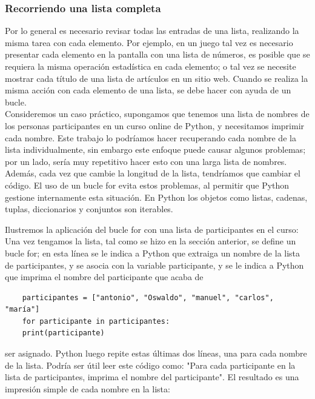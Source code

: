 \subsubsection{Recorriendo una lista completa}

Por lo general es necesario revisar todas las entradas de una lista, realizando la misma
tarea con cada elemento. Por ejemplo, en un juego tal vez es necesario presentar cada elemento en la pantalla con una lista de números, es posible que se requiera la misma operación estadística en cada elemento; o tal vez se necesite mostrar cada título de una lista de artículos en un sitio web.  Cuando se realiza la misma acción con cada elemento de una lista, se debe hacer con ayuda de un bucle.\\

Consideremos un caso práctico, supongamos que tenemos una lista de nombres de los personas participantes en un curso online de Python, y necesitamos imprimir cada nombre. Este trabajo lo podríamos hacer recuperando cada nombre de la lista individualmente, sin embargo este enfoque puede causar algunos problemas; por un lado, sería muy repetitivo hacer esto con una larga lista de nombres. Además, cada vez que cambie la longitud de la lista, tendríamos que cambiar el código. El uso de un bucle {\ttfamily for} evita estos problemas, al permitir que Python gestione internamente esta situación. En Python los objetos como listas, cadenas, tuplas, diccionarios y conjuntos son iterables. 

Ilustremos la aplicación del bucle {\ttfamily for} con una lista de participantes en el curso:
Una vez tengamos la lista, tal como se hizo en la sección anterior, se define
un bucle {\ttfamily for}; en esta línea se le indica a Python que extraiga un nombre de la lista de {\ttfamily participantes}, y se asocia con la variable {\ttfamily participante}, y se le indica a Python que imprima el nombre del participante que  acaba de    

\hspace{-2.3cm}{\ttfamily \scriptsize curso.py} \vspace{-0.58cm}
\begin{lstlisting}		
	participantes = ["antonio", "Oswaldo", "manuel", "carlos", "maría"]
	for participante in participantes:
	print(participante)	
\end{lstlisting}	

\noindent ser asignado. Python luego repite estas últimas dos líneas, una para cada nombre de la lista. Podría ser útil leer este código como:  "Para cada participante en la lista de participantes, imprima el nombre del participante". El resultado es una impresión simple de cada nombre en la lista:

